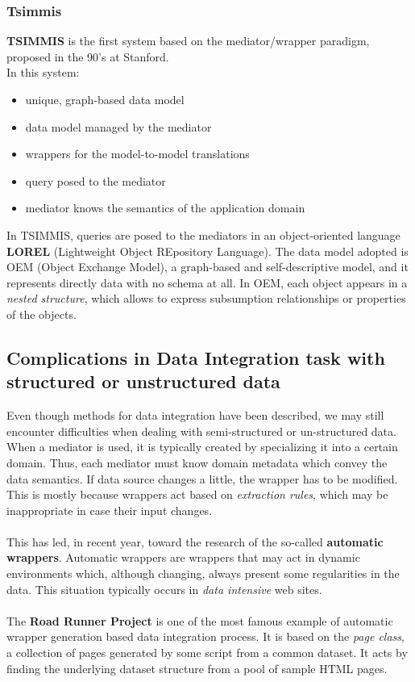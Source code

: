 \documentclass[10pt,a4paper]{article}
\newcommand{\nline}{\\~\\}
\begin{document}
\begin{justify}
\subsubsection{Tsimmis}
\textbf{TSIMMIS} is the first system based on the mediator/wrapper paradigm, proposed in the 90’s at Stanford. \\ 
In this system:
\begin{itemize}
	\item unique, graph-based data model
	\item data model managed by the mediator
	\item wrappers for the model-to-model translations
	\item query posed to the mediator
	\item mediator knows the semantics of the application domain
\end{itemize}
In TSIMMIS, queries are posed to the mediators in an object-oriented language \textbf{LOREL} (Lightweight Object REpository Language). The data model adopted is OEM (Object Exchange Model), a graph-based and self-descriptive model, and it represents directly data with no schema at all. In OEM, each object appears in a \textit{nested structure}, which allows to express subsumption relationships or properties of the objects.
\subsection{Complications in Data Integration task with structured or unstructured data}
Even though methods for data integration have been described, we may still encounter difficulties when dealing with semi-structured or un-structured data. When a mediator is used, it is typically created by specializing it into a certain domain. Thus, each mediator must know domain metadata which convey the data semantics. If data source changes a little, the wrapper has to be modified. This is mostly because wrappers act based on \textit{extraction rules}, which may be inappropriate in case their input changes.\nline This has led, in recent year, toward the research of the so-called \textbf{automatic wrappers}. Automatic wrappers are wrappers that may act in dynamic environments which, although changing, always present some regularities in the data. This situation typically occurs in \textit{data intensive} web sites. \nline The \textbf{Road Runner Project} is one of the most famous example of automatic wrapper generation based data integration process. It is based on the \textit{page class}, a collection of pages generated by some script from a common dataset. It acts by finding the underlying dataset structure from a pool of sample HTML pages.\\

\end{justify}
\end{document}
